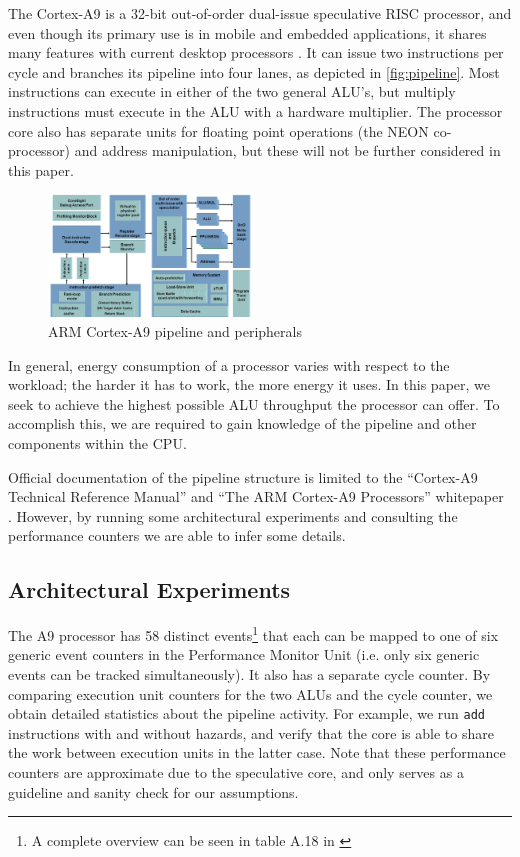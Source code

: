 The Cortex-A9 is a 32-bit out-of-order dual-issue speculative RISC processor,
and even though its primary use is in mobile and embedded applications, it
shares many features with current desktop processors \cite{patterson,hennessy}.
It can issue two instructions per cycle and branches its pipeline into four
lanes, as depicted in \autoref{fig:pipeline}. Most instructions can
execute in either of the two general ALU's, but multiply instructions must
execute in the ALU with a hardware multiplier. The processor core also has
separate units for floating point operations (the NEON co-processor) and address
manipulation, but these will not be further considered in this paper.

\begin{figure}
    \begin{centering}
        \includegraphics[width=0.48\textwidth]{figures/A9-Pipeline-hres}
        \caption{ARM Cortex-A9 pipeline and peripherals\cite{a9whitepaper}}
        \label{fig:pipeline}
    \end{centering}
\end{figure}

In general, energy consumption of a processor varies with respect to the
workload; the harder it has to work, the more energy it uses. In this paper, we
seek to achieve the highest possible ALU throughput the processor can offer. To
accomplish this, we are required to gain knowledge of the pipeline and other
components within the CPU.

Official documentation of the pipeline structure is limited to the ``Cortex-A9
Technical Reference Manual'' \cite{armtech} and ``The ARM Cortex-A9 Processors''
whitepaper \cite{a9whitepaper}. However, by running some architectural
experiments and consulting the performance counters we are able to
infer some details.

\subsection{Architectural Experiments}
\label{arch_experiments}
The A9 processor has 58 distinct events\footnote{A complete overview can be seen
in table A.18 in \cite{armtech}} that
each can be mapped to one of six generic event counters in the Performance
Monitor Unit (i.e. only six generic events can be tracked simultaneously). It
also has a separate cycle counter. By comparing execution unit counters for the
two ALUs and the cycle counter, we obtain detailed statistics about the pipeline
activity. For example, we run \texttt{add} instructions with and without
hazards, and verify that the core is able to share the work between execution
units in the latter case. Note that these performance counters are approximate
due to the speculative core, and only serves as a guideline and sanity check for
our assumptions.

